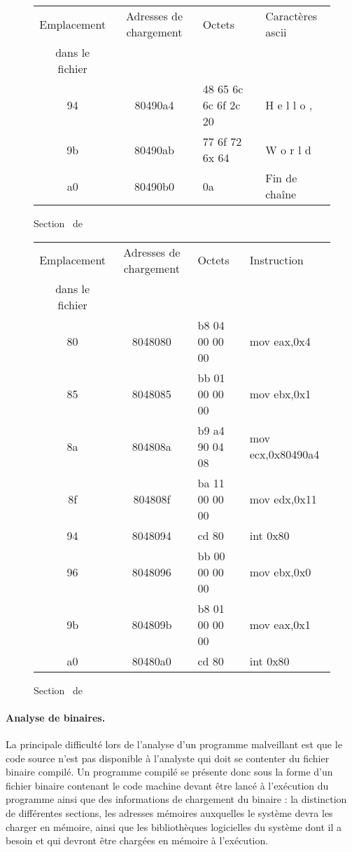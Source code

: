 \begin{figure}[h]
\begin{center}
\begin{tabular}{|c|c|l|l|}
\hline
Emplacement & Adresses de chargement & Octets & Caractères ascii \\
dans le fichier & &  & \\
\hline
94 & 80490a4 & 48 65 6c 6c 6f 2c 20 & H e l l o ,   \\
9b & 80490ab & 77 6f 72 6x 64 & W o r l d \\
a0 & 80490b0 & 0a & Fin de chaîne       \\
\hline
\end{tabular}
\end{center}
\caption{Section \pdata\ de \helloworld}
\label{fig:data_helloworld}
\end{figure}

\begin{figure}[h]
\begin{center}
\begin{tabular}{|c|c|l|l|}
\hline
Emplacement & Adresses de chargement & Octets & Instruction\\ 
dans le fichier & &  & \\ 
\hline
80 & 8048080 & b8 04 00 00 00 & mov    eax,0x4       \\
85 & 8048085 & bb 01 00 00 00 & mov    ebx,0x1       \\
8a & 804808a & b9 a4 90 04 08 & mov    ecx,0x80490a4 \\
8f & 804808f & ba 11 00 00 00 & mov    edx,0x11      \\
94 & 8048094 & cd 80          & int    0x80          \\
96 & 8048096 & bb 00 00 00 00 & mov    ebx,0x0       \\
9b & 804809b & b8 01 00 00 00 & mov    eax,0x1       \\
a0 & 80480a0 & cd 80          & int    0x80          \\
\hline
\end{tabular}
\end{center}
\caption{Section \ptext\ de \helloworld}
\label{fig:text_helloworld}
\end{figure}


\paragraph{Analyse de binaires.}
La principale difficulté lors de l'analyse d'un programme malveillant est que le code source n'est pas disponible à l'analyste qui doit se contenter du fichier binaire compilé.
Un programme compilé se présente donc sous la forme d'un fichier binaire contenant le code machine devant être lancé à l'exécution du programme ainsi que des informations de chargement du binaire : la distinction de différentes sections, les adresses mémoires auxquelles le système devra les charger en mémoire, ainsi que les bibliothèques logicielles du système dont il a besoin et qui devront être chargées en mémoire à l'exécution.

